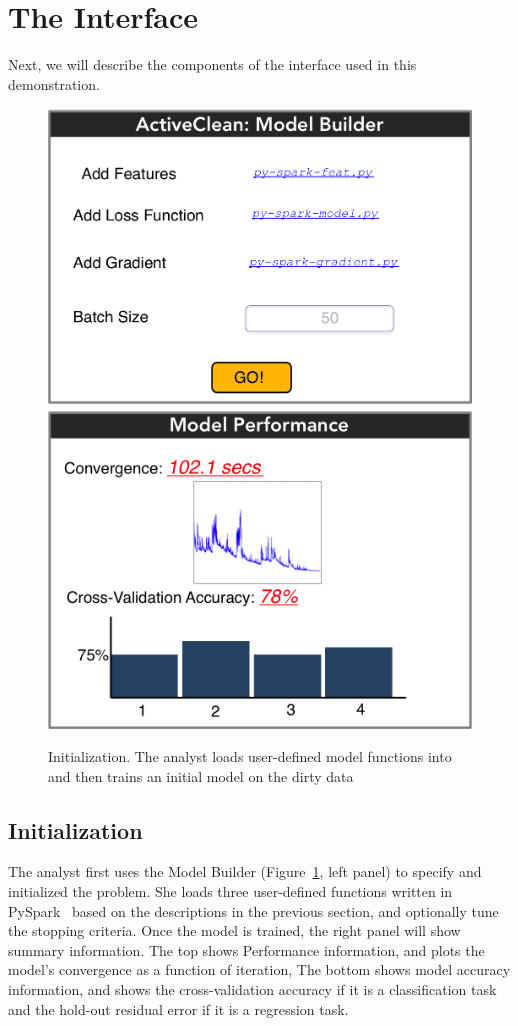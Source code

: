 \section{The Interface}
Next, we will describe the components of the \sys interface used in this demonstration. 

\begin{figure}[t]
\centering
 \includegraphics[width=0.49\columnwidth]{figs/interface1.png}
 \includegraphics[width=0.46\columnwidth]{figs/interface2.png}
 \caption{Initialization. The analyst loads user-defined model functions into \sys and then trains an initial model on the dirty data \label{irun}}
\end{figure}

\subsection{Initialization}
The analyst first uses the \textsf{Model Builder} (Figure~\ref{irun}, left panel) to specify and initialized the problem.
She loads three user-defined functions written in PySpark~\cite{pyspark} based on the descriptions in the previous section, and
optionally  tune the stopping criteria.
Once the model is trained, the right panel will show summary information.
The top shows \textsf{Performance} information, and plots the model's convergence as a function of iteration,
The bottom shows model accuracy information, and shows the cross-validation accuracy if it is a classification task and the hold-out residual error if it is a regression task.

